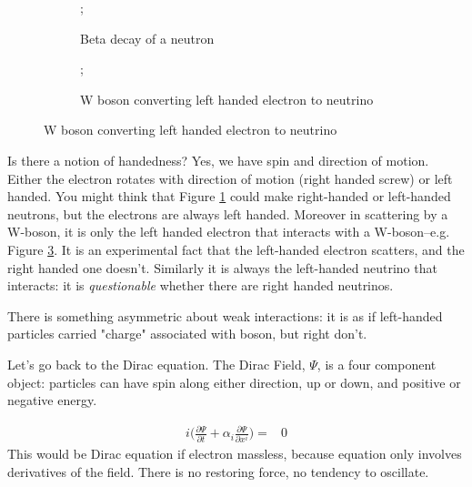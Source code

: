 \documentclass[]{article}
\begin{document}
\begin{figure}[H]
	\caption{The electron is always left handed in n weak interactions}
	\begin{subfigure}[t]{0.4\textwidth}
		\caption{Beta decay of a neutron}\label{fig:2-9-beta-decay-neutron}
		;
	\end{subfigure}
	\hfill
	\begin{subfigure}[t]{0.4\textwidth}
		\caption{W boson converting left handed electron to neutrino}\label{fig:2-9-W-boson}
		;
	\end{subfigure}
\end{figure}

Is there a notion of handedness? Yes, we have spin and direction of motion. Either the electron rotates with direction of motion (right handed screw) or left handed. You might think that Figure \ref{fig:2-9-beta-decay-neutron} could make right-handed or left-handed neutrons, but the electrons are always left handed. Moreover in scattering by a W-boson, it is only the left handed electron that interacts with a W-boson--e.g. Figure \ref{fig:2-9-W-boson}. It is an experimental fact that the left-handed electron scatters, and the right handed one doesn't. Similarly it is always the left-handed neutrino that interacts: it is \emph{questionable} whether there are right handed neutrinos.

There is something asymmetric about weak interactions: it is as if left-handed particles carried "charge" associated with boson, but right don't.

Let's go back to the Dirac equation. The Dirac Field, $\Psi$, is a four component object: particles can have spin along either direction, up or down, and positive or negative energy.

\begin{align*}
	i \big(\frac{\partial \Psi}{\partial t} + \alpha_i \frac{\partial \Psi}{\partial 	x^i}\big) =&0
\end{align*}
 This would be Dirac equation if electron massless, because equation only involves derivatives of the field. There is no restoring force, no tendency to oscillate.
 
\end{document}
